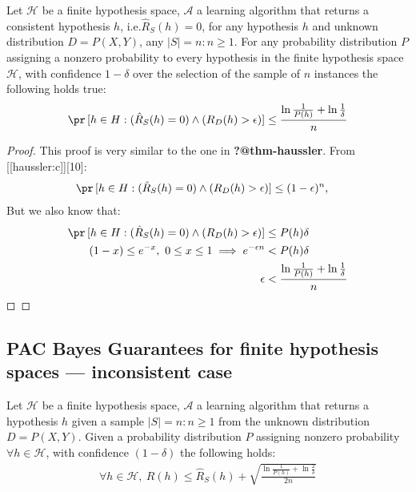 \documentclass[
  letterpaper,
  12pt,
  british]{tufte-book}
\theoremstyle{plain}
\theoremstyle{definition}
\theoremstyle{plain}
\theoremstyle{remark}
\begin{document}
Let \(\mathcal{H}\) be a finite hypothesis space, \(\mathcal{A}\) a
learning algorithm that returns a consistent hypothesis \(h\),
i.e.\(\hat{R}_{S}(h)=0\), for any hypothesis \(h\) and unknown
distribution \(D=P(\mathit{X},\mathit{Y})\), any \(|S|=n: n \geq 1\).
For any probability distribution \(P\) assigning a nonzero probability
to every hypothesis in the finite hypothesis space \(\mathcal{H}\), with
confidence \(1-\delta\) over the selection of the sample of \(n\)
instances the following holds true:\\

\begin{align}
        \pr\,[h \in H: (\hat{R}_{S}(h)=0) \land (R_{D}(h)>\epsilon)]\leq \frac{\ln \frac{1}{P(h)}+ \ln \frac{1}{\delta}}{n}
    
\end{align}

\begin{proof}

This proof is very similar to the one in \textbf{?@thm-haussler}. From
{[}{[}haussler:c{]}{]}{[}10{]}: \begin{align}
        \pr\,[h \in H: (\hat{R}_{S}(h)=0) \land (R_{D}(h)>\epsilon)] &\leq (1-\epsilon)^n,
    
\end{align} But we also know that: \begin{align}
        \pr\,[h \in H: (\hat{R}_{S}(h)=0) \land (R_{D}(h)>\epsilon)] &\leq P(h)\delta\\
        (1-x) \leq e^{-x},~0 \leq x \leq 1 \implies 
        e^{-\epsilon n} &< P(h) \delta\\
        \epsilon &< \frac{\ln \frac{1}{P(h)}+ \ln \frac{1}{\delta}}{n}  \nonumber
    
\end{align} ◻

\end{proof}

\hypertarget{pac-bayes-guarantees-for-finite-hypothesis-spaces-inconsistent-case}{%
\subsection{PAC Bayes Guarantees for finite hypothesis spaces ---
inconsistent
case}\label{pac-bayes-guarantees-for-finite-hypothesis-spaces-inconsistent-case}}

\protect\hypertarget{thrm:pac-bayes}{}{}Let \(\mathcal{H}\) be a finite
hypothesis space, \(\mathcal{A}\) a learning algorithm that returns a
hypothesis \(h\) given a sample \(|S|=n: n \geq 1\) from the unknown
distribution \(D=P(\mathit{X},\mathit{Y})\). Given a probability
distribution \(P\) assigning nonzero probability
\(\forall h \in \mathcal{H}\), with confidence \((1-\delta)\) the
following holds:\\
\begin{align}
        \forall h \in \mathcal{H},~R(h)\leq\hat{R}_{S}(h) + \sqrt{\frac{\ln{\frac{1}{P(h)}}+ \ln{\frac{2}{\delta}}}{2n}}
    
\end{align}
\end{document}

